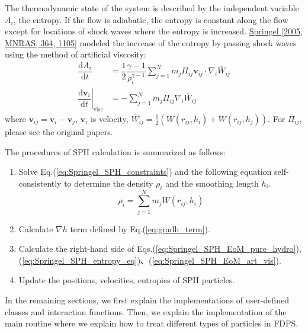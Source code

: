 The thermodynamic state of the system is described by the independent variable $A_{i}$, the entropy. If the flow is adiabatic, the entropy is constant along the flow except for locations of shock waves where the entropy is increased. \href{https://doi.org/10.1111/j.1365-2966.2005.09655.x}{Springel [2005, MNRAS, 364, 1105]} modeled the increase of the entropy by passing shock waves using the method of artificial viscosity:
\begin{align}
\dfrac{\mathrm{d}A_{i}}{\mathrm{d}t} & = \dfrac{1}{2}\dfrac{\gamma-1}{\rho^{\gamma-1}_{i}}\sum^{N}_{j=1}m_{j}\Pi_{ij}\bm{v}_{ij}\cdot\nabla_{i}\overline{W}_{ij} \label{eq:Springel_SPH_entropy_eq} \\
\left.\dfrac{\mathrm{d}\bm{v}_{i}}{\mathrm{d}t}\right|_{\mathrm{visc}} & = -\sum^{N}_{j=1}m_{j}\Pi_{ij}\nabla_{i}\overline{W}_{ij} \label{eq:Springel_SPH_EoM_art_vis}
\end{align}
where $\bm{v}_{ij}=\bm{v}_{i}-\bm{v}_{j}$, $\bm{v}_{i}$ is velocity, $\overline{W}_{ij}=\frac{1}{2}(W(r_{ij},h_{i})+W(r_{ij},h_{j}))$. For $\Pi_{ij}$, please see the original papers.

The procedures of SPH calculation is summarized as follows:
\begin{screen}
\begin{enumerate}[leftmargin=*,itemsep=-1ex,label={(\arabic*)}]
\item Solve Eq.(\ref{eq:Springel_SPH_constraints}) and the following equation self-consistently to determine the density $\rho_{i}$ and the smoothing length $h_{i}$.
\begin{equation}
\rho_{i} = \sum^{N}_{j=1}m_{j}W(r_{ij},h_{i}) \label{eq:SPH_density_def}
\end{equation}
\item Calculate $\nabla h$ term defined by Eq.(\ref{eq:gradh_term}).
\item Calculate the right-hand side of Eqs.(\ref{eq:Springel_SPH_EoM_pure_hydro}), (\ref{eq:Springel_SPH_entropy_eq})、(\ref{eq:Springel_SPH_EoM_art_vis}).
\item Update the positions, velocities, entropies of SPH particles.
\end{enumerate}
\end{screen}


In the remaining sections, we first explain the implementations of user-defined classes and interaction functions. Then, we explain the implementation of the main routine where we explain how to treat different types of particles in FDPS.

